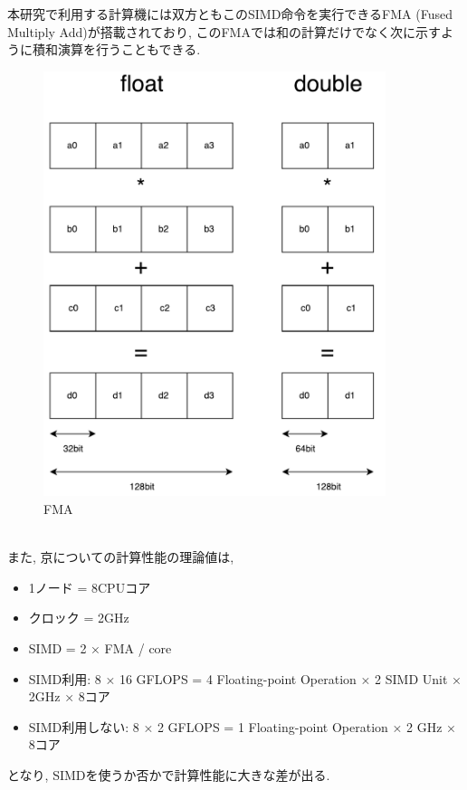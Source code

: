 本研究で利用する計算機には双方ともこのSIMD命令を実行できるFMA (Fused Multiply Add)\cite{simd-fma}が搭載されており,
このFMAでは和の計算だけでなく次に示すように積和演算を行うこともできる.\\
\begin{figure}[htb]
 \begin{center}
    \includegraphics[width=10cm]{./images/FMA.pdf}
    \caption{FMA}
    \label{fig:fma-image}
 \end{center}
\end{figure}~\\
また, 京についての計算性能の理論値は,\\
\begin{itemize}
  \item 1ノード = 8CPUコア
  \item クロック = 2GHz
  \item SIMD = 2 × FMA / core
  \item SIMD利用: 8 × 16 GFLOPS = 4 Floating-point Operation × 2 SIMD Unit × 2GHz × 8コア
  \item SIMD利用しない: 8 × 2 GFLOPS = 1 Floating-point Operation × 2 GHz × 8コア
\end{itemize}
となり, SIMDを使うか否かで計算性能に大きな差が出る.\\

